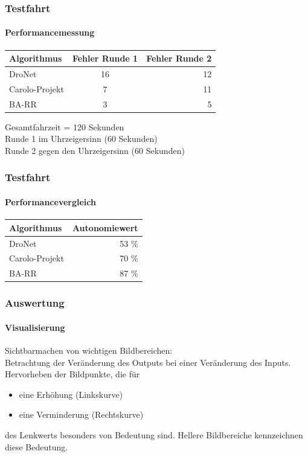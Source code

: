\documentclass{beamer}
\begin{document}
\begin{frame}
\frametitle{Testfahrt}
\framesubtitle{Performancemessung}
\begin{table}[h]
  \begin{center}
    \label{tab:testfahrten}
    \begin{tabular}{l|c|r} 
      \textbf{Algorithmus} & \textbf{Fehler Runde 1} & \textbf{Fehler Runde 2}\\
      \hline
      DroNet & 16 & 12\\
      Carolo-Projekt & 7 & 11\\
       BA-RR& 3 & 5\\
    \end{tabular}
  \end{center}
\end{table}
Gesamtfahrzeit = 120 Sekunden\\
Runde 1 im Uhrzeigersinn (60 Sekunden)\\
Runde 2 gegen den Uhrzeigersinn (60 Sekunden)

\end{frame}

\begin{frame}
\frametitle{Testfahrt}
\framesubtitle{Performancevergleich}

\begin{table}[h]
  \begin{center}
    \label{tab:autonomie}
    \begin{tabular}{l|r}
      \textbf{Algorithmus} & \textbf{Autonomiewert} \\
      \hline
      DroNet & 53 \% \\
      Carolo-Projekt & 70 \%  \\
       BA-RR& 87 \% \\
    \end{tabular}
  \end{center}
\end{table}

\end{frame}

\begin{frame}
\frametitle{Auswertung}
\framesubtitle{Visualisierung}
Sichtbarmachen von wichtigen Bildbereichen:\\
Betrachtung der Veränderung des Outputs bei einer Veränderung des Inputs.\\
Hervorheben der Bildpunkte, die für\\
\begin{itemize}
\item{eine Erhöhung (Linkskurve)}
\item{eine Verminderung (Rechtskurve)}
\end{itemize}
des Lenkwerts besonders von Bedeutung sind.
Hellere Bildbereiche kennzeichnen diese Bedeutung.

\end{frame}
\end{document}
